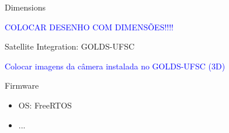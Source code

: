 
\begin{frame}{Dimensions}

    \textcolor{blue}{COLOCAR DESENHO COM DIMENSÕES!!!!}

\end{frame}


\begin{frame}{Satellite Integration: GOLDS-UFSC}

\textcolor{blue}{Colocar imagens da câmera instalada no GOLDS-UFSC (3D)}

\end{frame}


\begin{frame}{Firmware}

    \begin{itemize}
        \item OS: FreeRTOS
        \item ...
    \end{itemize}

\end{frame}



